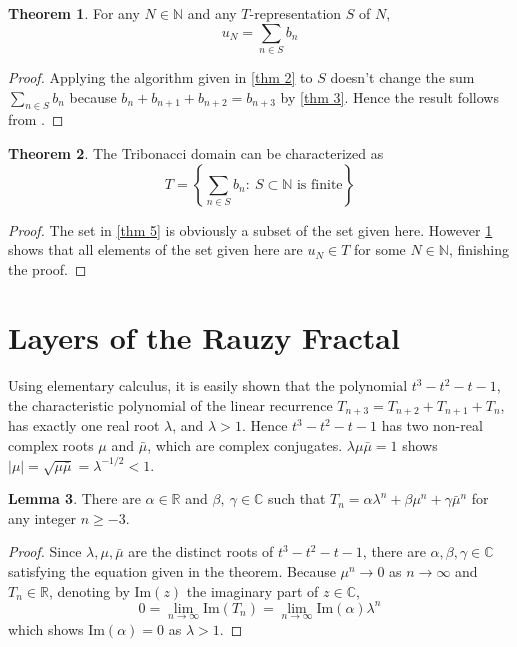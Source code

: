 \documentclass{article}
\theoremstyle{definition}
\newtheorem{theorem}{Theorem}
\newtheorem{lemma}[theorem]{Lemma}
\begin{document}
\begin{theorem}
\label{thm 6}
For any $N\in\mathbb{N}$ and any $T$-representation $S$ of $N$, \[ u_N=\sum_{n\in S} b_n\]
\end{theorem}
\begin{proof}
Applying the algorithm given in \cref{thm 2} to $S$ doesn't change the sum $\sum_{n\in S}b_n$ because $b_n+b_{n+1}+b_{n+2}=b_{n+3}$ by \cref{thm 3}. Hence the result follows from . 
\end{proof}

\begin{theorem}
\label{thm 7}
The Tribonacci domain can be characterized as
\[ T = \left\{ \sum_{n\in S}b_n:\ S\subset \mathbb{N}  \text{ is finite}\right\}\]
\end{theorem}
\begin{proof}
The set in \cref{thm 5} is obviously a subset of the set given here. However \cref{thm 6} shows that all elements of the set given here are $u_N\in T$ for some $N\in \mathbb{N}$, finishing the proof.
\end{proof}


\section{Layers of the Rauzy Fractal}
\label{sec3}

Using elementary calculus, it is easily shown that the polynomial $t^3-t^2-t-1$, the characteristic polynomial of the linear recurrence $T_{n+3}=T_{n+2}+T_{n+1}+T_n$, has exactly one real root $\lambda$, and $\lambda >1$. Hence $t^3-t^2-t-1$ has two non-real complex roots $\mu$ and $\bar\mu$, which are complex conjugates. $\lambda\mu\bar{\mu}=1$ shows $|\mu|=\sqrt{\mu\bar{\mu}}=\lambda^{-1/2}<1$. 

\begin{lemma}
\label{thm 8-0}
There are $\alpha\in\mathbb{R}$ and $\beta, \ \gamma\in \mathbb{C}$ such that $T_n=\alpha\lambda^n+\beta\mu^n+\gamma \bar{\mu}^n$ for any integer $n\geq -3$.
\end{lemma}
\begin{proof}
Since $\lambda, \mu, \bar{\mu}$ are the distinct roots of $t^3-t^2-t-1$, there are $\alpha, \beta, \gamma\in\mathbb{C}$ satisfying the equation given in the theorem. Because $\mu^n\rightarrow0$ as $n\rightarrow\infty$ and $ T_n\in\mathbb{R}$, denoting by $\text{Im}(z)$ the imaginary part of $z\in\mathbb{C}$,
 \[
0=\lim_{n\rightarrow\infty} \text{Im}(T_n)= \lim_{n\rightarrow\infty}\text{Im}(\alpha)\lambda^n
\]
which shows $\text{Im}(\alpha)=0$ as $\lambda>1$.
\end{proof}
\end{document}
